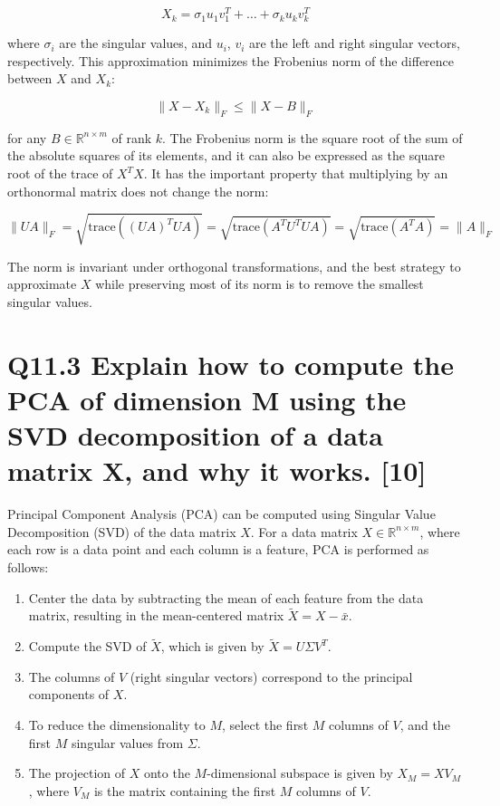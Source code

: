 \documentclass[11pt]{article}
\begin{document}
\[
X_k = \sigma_1 u_1 v_1^T + \ldots + \sigma_k u_k v_k^T
\]

where \( \sigma_i \) are the singular values, and \( u_i \), \( v_i \) are the left and right singular vectors, respectively. This approximation minimizes the Frobenius norm of the difference between \( X \) and \( X_k \):

\[
\| X - X_k \|_F \leq \| X - B \|_F
\]

for any \( B \in \mathbb{R}^{n \times m} \) of rank \( k \). The Frobenius norm is the square root of the sum of the absolute squares of its elements, and it can also be expressed as the square root of the trace of \( X^T X \). It has the important property that multiplying by an orthonormal matrix does not change the norm:

\[
\| U A \|_F = \sqrt{\text{trace}((UA)^T UA)} = \sqrt{\text{trace}(A^T U^T U A)} = \sqrt{\text{trace}(A^T A)} = \| A \|_F
\]

The norm is invariant under orthogonal transformations, and the best strategy to approximate \( X \) while preserving most of its norm is to remove the smallest singular values.

\section{Q11.3 Explain how to compute the PCA of dimension M using the SVD decomposition of a data matrix X, and why it works. [10]}

Principal Component Analysis (PCA) can be computed using Singular Value Decomposition (SVD) of the data matrix \( X \). For a data matrix \( X \in \mathbb{R}^{n \times m} \), where each row is a data point and each column is a feature, PCA is performed as follows:

\begin{enumerate}
    \item Center the data by subtracting the mean of each feature from the data matrix, resulting in the mean-centered matrix \( \tilde{X} = X - \bar{x} \).
    \item Compute the SVD of \( \tilde{X} \), which is given by \( \tilde{X} = U\Sigma V^T \).
    \item The columns of \( V \) (right singular vectors) correspond to the principal components of \( X \).
    \item To reduce the dimensionality to \( M \), select the first \( M \) columns of \( V \), and the first \( M \) singular values from \( \Sigma \).
    \item The projection of \( X \) onto the \( M \)-dimensional subspace is given by \( X_M = X V_M \), where \( V_M \) is the matrix containing the first \( M \) columns of \( V \).
\end{enumerate}
\end{document}
